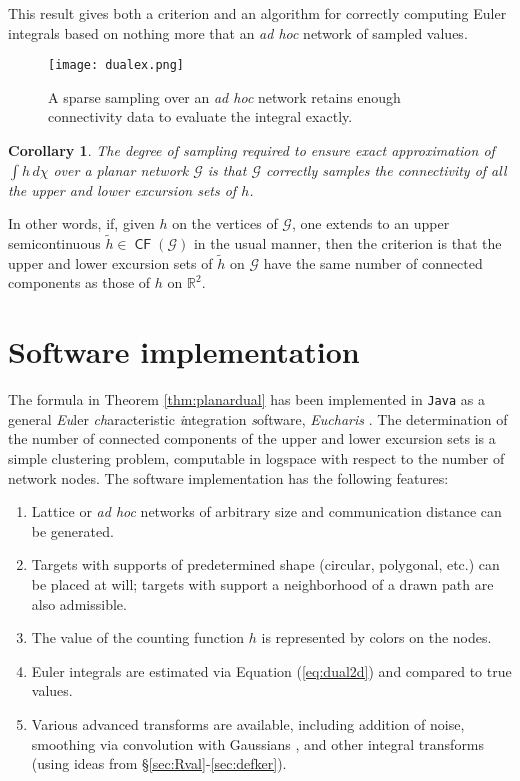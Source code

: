 \documentclass{psapm-l}
\newtheorem{corollary}[theorem]{Corollary}
\theoremstyle{definition}
\theoremstyle{remark}
\numberwithin{equation}{section}
\begin{document}
This result gives both a criterion and an algorithm for correctly computing Euler integrals based on nothing more that an {\em ad hoc} network of sampled values.
\begin{figure}[hbt]
\begin{center}
\texttt{[image: dualex.png]}
\caption{A sparse sampling over an {\em ad hoc} network retains enough connectivity data to evaluate the integral exactly.}
\label{fig:dualex}
\end{center}
\end{figure}

\begin{corollary}
\label{cor:sampling}
The degree of sampling required to ensure exact approximation of $\int h\,d\chi$ over a planar network ${{\mathcal G}}$ is that ${{\mathcal G}}$ correctly samples the connectivity of all the upper and lower excursion sets of $h$.
\end{corollary}

In other words, if, given $h$ on the vertices of ${{\mathcal G}}$, one extends to an upper semicontinuous $\tilde{h}\in{{{\operatorname{\mathsf{{CF}}}}}}({{\mathcal G}})$ in the usual manner, then the criterion is that the upper and lower excursion sets of $\tilde{h}$ on ${{\mathcal G}}$ have the same number of connected components as those of $h$ on ${{\mathbb R}}^2$.

\section{Software implementation}
\label{sec:eucharis}

The formula in Theorem \ref{thm:planardual} has been implemented in {\tt Java} as a general {\em Eu}ler {\em ch}aracteristic {\em i}ntegration {\em s}oftware, {\em Eucharis} \cite{Eucharis}. The determination of the number of connected components of the upper and lower excursion sets is a simple clustering problem, computable in logspace with respect to the number of network nodes. The software implementation has the following features:
\begin{enumerate}
\item Lattice or {\em ad hoc} networks of arbitrary size and communication distance can be generated.
\item Targets with supports of predetermined shape (circular, polygonal, etc.) can be placed at will; targets with support a neighborhood of a drawn path are also admissible.
\item  The value of the counting function $h$ is represented by colors on the nodes.
\item Euler integrals are estimated via Equation (\ref{eq:dual2d}) and compared to true values.
\item Various advanced transforms are available, including addition of noise, smoothing via convolution with Gaussians , and other integral transforms (using ideas from \S\ref{sec:Rval}-\ref{sec:defker}).
\end{enumerate}
\end{document}
